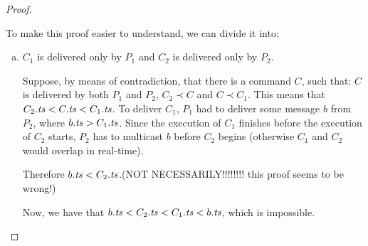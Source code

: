 \documentclass{usiinftr}
\begin{document}
\begin{proof}
\begin{enumerate}[i)]
To make this proof easier to understand, we can divide it into:

\begin{enumerate}[a)]

\item $C_1$ is delivered only by $P_1$ and $C_2$ is delivered only by $P_2$.

Suppose, by means of contradiction, that there is a command $C$, such that: $C$ is delivered by both $P_1$ and $P_2$, $C_2 \prec C$ and $C \prec C_1$. This means that $C_2.\text{\textit{ts}} < C.\text{\textit{ts}} < C_1.\text{\textit{ts}}$. To deliver $C_1$, $P_1$ had to deliver some message $b$ from $P_2$, where $b.\text{\textit{ts}} > C_1.\text{\textit{ts}}$. Since the execution of $C_1$ finishes before the execution of $C_2$ starts, $P_2$ has to multicast $b$ before $C_2$ begins (otherwise $C_1$ and $C_2$ would overlap in real-time).

Therefore $b.\text{\textit{ts}} < C_2.\text{\textit{ts}}$.(NOT NECESSARILY!!!!!!!! this proof seems to be wrong!)

Now, we have that $b.\text{\textit{ts}} < C_2.\text{\textit{ts}} < C_1.\text{\textit{ts}} < b.\text{\textit{ts}}$, which is impossible. 


\end{enumerate}




\end{enumerate}

\end{proof}
\end{document}
